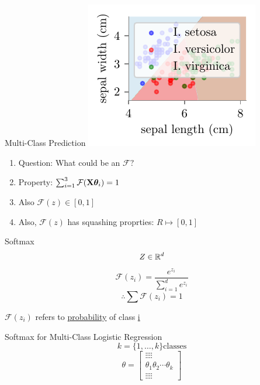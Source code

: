 \documentclass{beamer}
\begin{document}
\begin{frame}{Multi-Class Prediction}
\includegraphics[scale=0.8]{../assets/logistic-regression/figures/logisitic-iris-prediction.pdf}
\pause \begin{enumerate}
	\item Question: What could be an $\mathcal{F}?$
	\item Property: $\sum_{i=1}^{3}\mathcal{F}{({\mathbf{X}\boldsymbol{\theta}_i})} = 1$
	\item Also $\mathcal{F}(z)\in [0, 1]$
	\item Also, $\mathcal{F}(z)$ has squashing proprties: $R \mapsto [0, 1]$
\end{enumerate}


\end{frame}
\begin{frame}{Softmax}
\begin{equation*}
Z \in \mathbb{R}^{d}
\end{equation*}
\begin{equation*}
\mathcal{F}(z_{i}) = \frac{e^{z_{i}}}{\sum_{i=1}^{d}e^{z_{i}}}
\end{equation*}
\begin{equation*}
\therefore \sum \mathcal{F}(z_{i}) = 1
\end{equation*}

$\mathcal{F}(z_{i})$ refers to \underline{probability} of class \underline{i}
\end{frame}
\begin{frame}{Softmax for Multi-Class Logistic Regression}
\begin{equation*}
k = \{1, \ldots, k\} \text{classes}
\end{equation*}
$$
\theta=\left[\begin{array}{llll}
{\vdots} {\vdots} {\vdots} {\vdots} \\
{\theta_{1}} {\theta_{2}} {\cdots} {\theta_{k}} \\
{\vdots} {\vdots} {\vdots} {\vdots} 	
\end{array}\right]
$$
\centering
{}
\end{frame}
\end{document}
